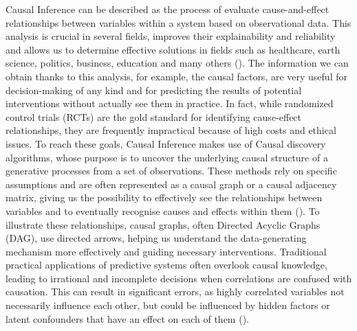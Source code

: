 Causal Inference can be described as the process of evaluate cause-and-effect relationships between variables within a system based on observational data. This analysis is crucial in several fields, improves their explainability and reliability and allows us to determine effective solutions in fields such as healthcare, earth science, politics, business, education and many others (\cite{peyrot1996causal}). The information we can obtain thanks to this analysis, for example, the causal factors, are very useful for decision-making of any kind and for predicting the results of potential interventions without actually see them in practice. In fact, while randomized control trials (RCTs) are the gold standard for identifying cause-effect relationships, they are frequently impractical because of high costs and ethical issues. To reach these goals, Causal Inference makes use of Causal discovery algorithms, whose purpose is to uncover the underlying causal structure of a generative processes from a set of observations. These methods rely on specific assumptions and are often represented as a causal graph or a causal adjacency matrix, giving us the possibility to effectively see the relationships between variables and to eventually recognise causes and effects within them (\cite{pearl2009causality}). To illustrate these relationships, causal graphs, often Directed Acyclic Graphs (DAG), use directed arrows, helping us understand the data-generating mechanism more effectively and guiding necessary interventions. Traditional practical applications of predictive systems often overlook causal knowledge, leading to irrational and incomplete decisions when correlations are confused with causation. This can result in significant errors, as highly correlated variables not necessarily influence each other, but could be influenced by hidden factors or latent confounders that have an effect on each of them (\cite{marwala2015causality}).\\

